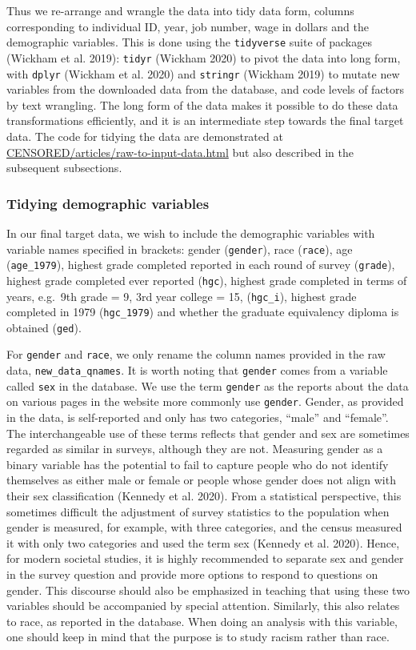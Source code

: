 \documentclass{article}
\begin{document}
Thus we re-arrange and wrangle the data into tidy data form, columns corresponding to individual ID, year, job number, wage in dollars and the demographic variables. This is done using the \texttt{tidyverse} suite of packages (Wickham et al. 2019): \texttt{tidyr} (Wickham 2020) to pivot the data into long form, with \texttt{dplyr} (Wickham et al. 2020) and \texttt{stringr} (Wickham 2019) to mutate new variables from the downloaded data from the database, and code levels of factors by text wrangling. The long form of the data makes it possible to do these data transformations efficiently, and it is an intermediate step towards the final target data. The code for tidying the data are demonstrated at \url{CENSORED/articles/raw-to-input-data.html} but also described in the subsequent subsections.

\hypertarget{tidydemog}{%
\subsubsection{Tidying demographic variables}\label{tidydemog}}

In our final target data, we wish to include the demographic variables with variable names specified in brackets: gender (\texttt{gender}), race (\texttt{race}), age (\texttt{age\_1979}), highest grade completed reported in each round of survey (\texttt{grade}), highest grade completed ever reported (\texttt{hgc}), highest grade completed in terms of years, e.g.~9th grade = 9, 3rd year college = 15, (\texttt{hgc\_i}), highest grade completed in 1979 (\texttt{hgc\_1979}) and whether the graduate equivalency diploma is obtained (\texttt{ged}).

For \texttt{gender} and \texttt{race}, we only rename the column names provided in the raw data, \texttt{new\_data\_qnames}. It is worth noting that \texttt{gender} comes from a variable called \texttt{sex} in the database. We use the term \texttt{gender} as the reports about the data on various pages in the website more commonly use \texttt{gender}. Gender, as provided in the data, is self-reported and only has two categories, ``male'' and ``female''. The interchangeable use of these terms reflects that gender and sex are sometimes regarded as similar in surveys, although they are not. Measuring gender as a binary variable has the potential to fail to capture people who do not identify themselves as either male or female or people whose gender does not align with their sex classification (Kennedy et al. 2020). From a statistical perspective, this sometimes difficult the adjustment of survey statistics to the population when gender is measured, for example, with three categories, and the census measured it with only two categories and used the term sex (Kennedy et al. 2020). Hence, for modern societal studies, it is highly recommended to separate sex and gender in the survey question and provide more options to respond to questions on gender. This discourse should also be emphasized in teaching that using these two variables should be accompanied by special attention. Similarly, this also relates to race, as reported in the database. When doing an analysis with this variable, one should keep in mind that the purpose is to study racism rather than race.
\end{document}
